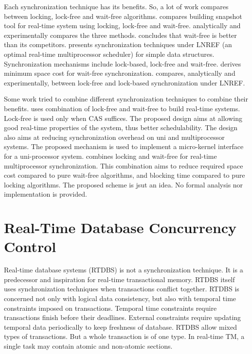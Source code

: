 Each synchronization technique has its benefits. So, a lot of work
compares between locking, lock-free and wait-free algorithms. \cite{726426}
compares building snapshot tool for real-time system using locking,
lock-free and wait-free. \cite{726426} analytically and experimentally
compares the three methods. \cite{726426} concludes that wait-free
is better than its competitors. \cite{4297311} presents synchronization
techniques under LNREF \cite{4032340} (an optimal real-time multiprocessor
scheduler) for simple data structures. Synchronization mechanisms include
lock-based, lock-free and wait-free. \cite{4297311} derives minimum
space cost for wait-free synchronization. \cite{4297311} compares,
analytically and experimentally, between lock-free and lock-based
synchronization under LNREF.

Some work tried to combine different synchronization techniques to
combine their benefits. \cite{hohmuth2001pragmatic} uses combination
of lock-free and wait-free to build real-time systems. Lock-free is
used only when CAS suffices. The proposed design aims at allowing
good real-time properties of the system, thus better schedulability.
The design also aims at reducing synchronization overhead on uni and
multiprocessor systems. The proposed mechanism is used to implement
a micro-kernel interface for a uni-processor system. \cite{5953690}
combines locking and wait-free for real-time multiprocessor synchronization.
This combination aims to reduce required space cost compared to pure
wait-free algorithms, and blocking time compared to pure locking algorithms.
The proposed scheme is jsut an idea. No formal analysis nor implementation
is provided.

\section{\label{sec:db concurrency control}Real-Time Database Concurrency Control}

Real-time database systems (RTDBS) is not a synchronization technique.
It is a predecessor and inspiration for real-time transactional memory.
RTDBS itself uses synchronization techniques when transactions conflict
together. RTDBS is concerned not only with logical data consistency,
but also with temporal time constraints imposed on transactions. Temporal
time constraints require transactions finish before their deadlines.
External constraints require updating temporal data periodically to
keep freshness of database. RTDBS allow mixed types of transactions.
But a whole transaction is of one type. In real-time TM, a single
task may contain atomic and non-atomic sections.

